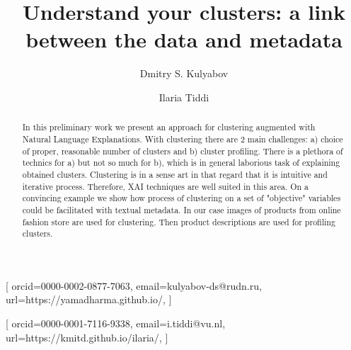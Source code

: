 \documentclass[
]{ceurart}
\begin{document}


\title{Understand your clusters: a link between the data and metadata}

\tnotemark[1]

\author[1,2]{Dmitry S. Kulyabov}[%
orcid=0000-0002-0877-7063,
email=kulyabov-ds@rudn.ru,
url=https://yamadharma.github.io/,
]
\cormark[1]
\fnmark[1]
\address[1]{Peoples' Friendship University of Russia (RUDN University),
  6 Miklukho-Maklaya St, Moscow, 117198, Russian Federation}
\address[2]{Joint Institute for Nuclear Research,
  6 Joliot-Curie, Dubna, Moscow region, 141980, Russian Federation}

\author[3]{Ilaria Tiddi}[%
orcid=0000-0001-7116-9338,
email=i.tiddi@vu.nl,
url=https://kmitd.github.io/ilaria/,
]
\fnmark[1]
\address[3]{Vrije Universiteit Amsterdam, De Boelelaan 1105, 1081 HV Amsterdam, The Netherlands}


\begin{abstract}
  In this preliminary work we present an approach for clustering augmented with Natural Language Explanations.
  With clustering there are 2 main challenges: a) choice of proper, reasonable number of clusters and b) cluster profiling.
  There is a plethora of technics for a) but not so much for b), which is in general laborious task of explaining obtained clusters.
  Clustering is in a sense art in that regard that it is intuitive and iterative process.
  Therefore, XAI techniques are well suited in this area.
  On a convincing example we show how process of clustering on a set of "objective" variables could be facilitated with textual metadata.
  In our case images of products from online fashion store are used for clustering.
  Then product descriptions are used for profiling clusters.
\end{abstract}
\end{document}
